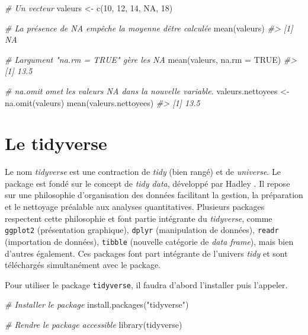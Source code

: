 \documentclass[
]{book}
\newenvironment{Shaded}{}{}
\newcommand{\AttributeTok}[1]{#1}
\newcommand{\CommentTok}[1]{\textit{#1}}
\newcommand{\ConstantTok}[1]{#1}
\newcommand{\DecValTok}[1]{#1}
\newcommand{\FunctionTok}[1]{#1}
\newcommand{\NormalTok}[1]{#1}
\newcommand{\OtherTok}[1]{#1}
\newcommand{\StringTok}[1]{#1}
\begin{document}
\begin{Shaded}
\begin{Highlighting}[]
\CommentTok{\# Un vecteur}
\NormalTok{valeurs }\OtherTok{\textless{}{-}}  \FunctionTok{c}\NormalTok{(}\DecValTok{10}\NormalTok{, }\DecValTok{12}\NormalTok{, }\DecValTok{14}\NormalTok{, }\ConstantTok{NA}\NormalTok{, }\DecValTok{18}\NormalTok{)}

\CommentTok{\# La présence de NA empêche la moyenne d\textquotesingle{}être calculée}
\FunctionTok{mean}\NormalTok{(valeurs)}
\CommentTok{\#\textgreater{} [1] NA}

\CommentTok{\# L\textquotesingle{}argument "na.rm = TRUE" gère les NA}
\FunctionTok{mean}\NormalTok{(valeurs, }\AttributeTok{na.rm =} \ConstantTok{TRUE}\NormalTok{)}
\CommentTok{\#\textgreater{} [1] 13.5}

\CommentTok{\# na.omit omet les valeurs NA dans la nouvelle variable.}
\NormalTok{valeurs.nettoyees }\OtherTok{\textless{}{-}}  \FunctionTok{na.omit}\NormalTok{(valeurs)}
\FunctionTok{mean}\NormalTok{(valeurs.nettoyees)}
\CommentTok{\#\textgreater{} [1] 13.5}
\end{Highlighting}
\end{Shaded}

\hypertarget{le-tidyverse}{%
\section{Le tidyverse}\label{le-tidyverse}}

Le nom \emph{tidyverse} \autocite{tidy} est une contraction de \emph{tidy} (bien rangé) et de \emph{universe}. Le package est fondé sur le concept de \emph{tidy data}, développé par Hadley \autocite{Wickham14}. Il repose sur une philosophie d'organisation des données facilitant la gestion, la préparation et le nettoyage préalable aux analyses quantitatives. Plusieurs packages respectent cette philosophie et font partie intégrante du \emph{tidyverse}, comme \texttt{ggplot2} (présentation graphique), \texttt{dplyr} (manipulation de données), \texttt{readr} (importation de données), \texttt{tibble} (nouvelle catégorie de \emph{data frame}), mais bien d'autres également. Ces packages font part intégrante de l'univers \emph{tidy} et sont téléchargés simultanément avec le package.

Pour utiliser le package \texttt{tidyverse}, il faudra d'abord l'installer puis l'appeler.

\begin{Shaded}
\begin{Highlighting}[]
\CommentTok{\# Installer le package}
\FunctionTok{install.packages}\NormalTok{(}\StringTok{"tidyverse"}\NormalTok{)}

\CommentTok{\# Rendre le package accessible}
\FunctionTok{library}\NormalTok{(tidyverse)}
\end{Highlighting}
\end{Shaded}
\end{document}
